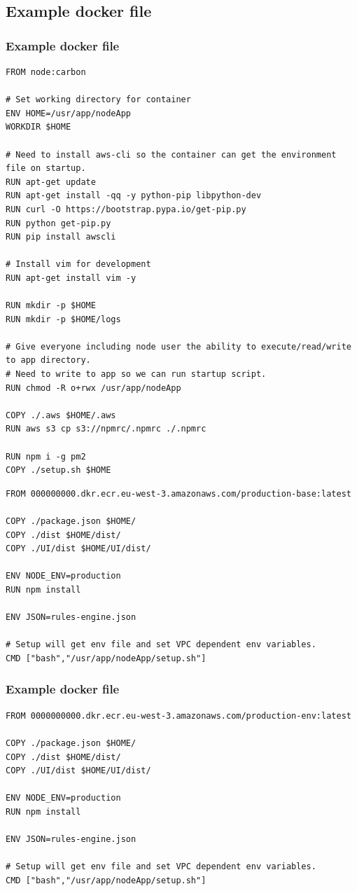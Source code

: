 \documentclass{beamer}
\begin{document}
\subsection{Example docker file} 
\begin{frame}[fragile] 
\frametitle{Example docker file}
\begin{example}
\tiny
\begin{verbatim}
FROM node:carbon

# Set working directory for container
ENV HOME=/usr/app/nodeApp
WORKDIR $HOME

# Need to install aws-cli so the container can get the environment file on startup.
RUN apt-get update
RUN apt-get install -qq -y python-pip libpython-dev 
RUN curl -O https://bootstrap.pypa.io/get-pip.py
RUN python get-pip.py
RUN pip install awscli

# Install vim for development
RUN apt-get install vim -y

RUN mkdir -p $HOME
RUN mkdir -p $HOME/logs

# Give everyone including node user the ability to execute/read/write to app directory.
# Need to write to app so we can run startup script.
RUN chmod -R o+rwx /usr/app/nodeApp 

COPY ./.aws $HOME/.aws
RUN aws s3 cp s3://npmrc/.npmrc ./.npmrc

RUN npm i -g pm2
COPY ./setup.sh $HOME
\end{verbatim}
\end{example}
\begin{example}
\tiny
\begin{verbatim}
FROM 000000000.dkr.ecr.eu-west-3.amazonaws.com/production-base:latest

COPY ./package.json $HOME/
COPY ./dist $HOME/dist/
COPY ./UI/dist $HOME/UI/dist/

ENV NODE_ENV=production
RUN npm install

ENV JSON=rules-engine.json

# Setup will get env file and set VPC dependent env variables.
CMD ["bash","/usr/app/nodeApp/setup.sh"]
\end{verbatim}
\end{example}
\end{frame}


\begin{frame}[fragile] 
\frametitle{Example docker file}
\begin{example}
\tiny
\begin{verbatim}
FROM 0000000000.dkr.ecr.eu-west-3.amazonaws.com/production-env:latest

COPY ./package.json $HOME/
COPY ./dist $HOME/dist/
COPY ./UI/dist $HOME/UI/dist/

ENV NODE_ENV=production
RUN npm install

ENV JSON=rules-engine.json

# Setup will get env file and set VPC dependent env variables.
CMD ["bash","/usr/app/nodeApp/setup.sh"]
\end{verbatim}
\end{example}
\end{frame}
\end{document}
